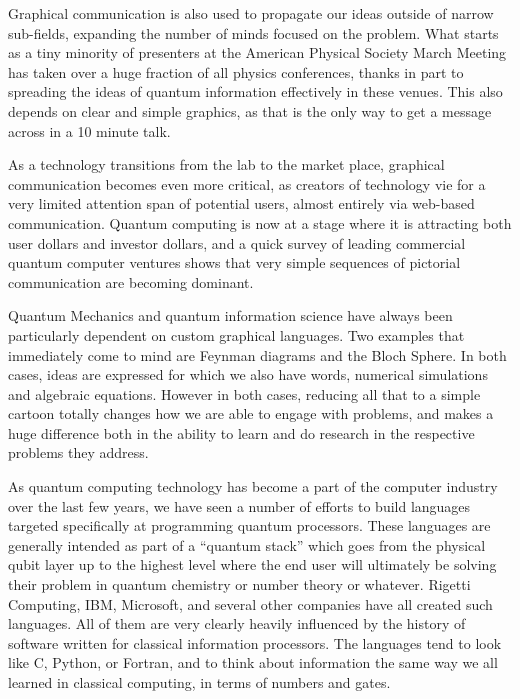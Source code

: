 \documentclass[11pt]{article}
\begin{document}
    Graphical communication is also used to propagate our ideas outside of narrow sub-fields, expanding the number of minds focused on the problem.  What starts as a tiny minority of presenters at the American Physical Society March Meeting has taken over a huge fraction of all physics conferences, thanks in part to spreading the ideas of quantum information effectively in these venues.  This also depends on clear and simple graphics, as that is the only way to get a message across in a 10 minute talk.  


    As a technology transitions from the lab to the market place, graphical communication becomes even more critical, as creators of technology vie for a very limited attention span of potential users, almost entirely via web-based communication.  Quantum computing is now at a stage where it is attracting both user dollars and investor dollars, and a quick survey of leading commercial quantum computer ventures shows that very simple sequences of pictorial communication are becoming dominant.    

    Quantum Mechanics and quantum information science have always been particularly dependent on custom graphical languages.  Two examples that immediately come to mind are Feynman diagrams and the Bloch Sphere.  In both cases, ideas are expressed for which we also have words, numerical simulations and algebraic equations.  However in both cases, reducing all that to a simple cartoon totally changes how we are able to engage with problems, and makes a huge difference both in the ability to learn and do research in the respective problems they address.


    As quantum computing technology has become a part of the computer industry over the last few years, we have seen a number of efforts to build languages targeted specifically at programming quantum processors.  These languages are generally intended as part of a ``quantum stack'' which goes from the physical qubit layer up to the highest level where the end user will ultimately be solving their problem in quantum chemistry or number theory or whatever.  Rigetti Computing, IBM, Microsoft, and several other companies have all created such languages.  All of them are very clearly heavily influenced by the history of software written for classical information processors. The languages tend to look like C, Python, or Fortran, and to think about information the same way we all learned in classical computing, in terms of numbers and gates.  
\end{document}
